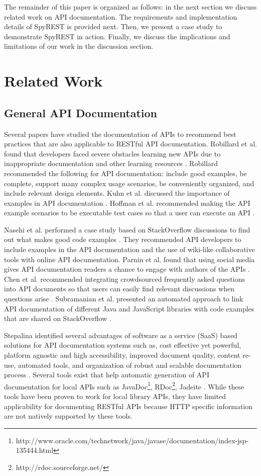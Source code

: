 The remainder of this paper is organized as follows: in the next section we discuss related work on API documentation. The requirements and implementation details of SpyREST is provided next. Then, we present a case study to demonstrate SpyREST in action. Finally, we discuss the implications and limitations of our work in the discussion section.


\section{Related Work} %
\label{sec:related_work}
\subsection{General API Documentation} %
\label{ssub:api_learnability}
Several papers have studied the documentation of APIs to recommend best practices that are also applicable to RESTful API documentation. Robillard et al. found that  developers faced severe obstacles learning new APIs due to inappropriate documentation and other learning resources \cite{Robillard_what_makes, Robillard_a_field_study}. Robillard recommended the following for API documentation: include good examples, be complete, support many complex usage scenarios, be conveniently organized, and include relevant design elements. Kuhn et al. discussed the importance of examples in API documentation \cite{Kuhn_on_designing}. Hoffman et al. recommended making the API example scenarios to be executable test cases so that a user can execute an API \cite{Hoffman_api_documentation}.

Nasehi et al. performed a case study based on StackOverflow discussions to find out what makes good code examples \cite{Nasehi_what_makes}. They recommended API developers to include examples in the API documentation and the use of wiki-like collaborative tools with online API documentation. Parnin et al. found that using social media gives API documentation readers a chance to engage with authors of the APIs \cite{Parnin_measuring}. Chen et al. recommended integrating crowdsourced frequently asked questions into API documents so that users can easily find relevant discussions when questions arise \cite{Chen_who_asked}. Subramanian et al. presented an automated approach to link API documentation of different Java and JavaScript libraries with code examples that are shared on StackOverflow \cite{Subramanian_live}.

Stepalina identified several advantages of software as a service (SaaS) based solutions for API documentation systems such as, cost effective yet powerful, platform agnostic and high accessibility, improved document quality, content re-use, automated tools, and organization of robust and scalable documentation process \cite{Stepalina_saas}. Several tools exist that help automatic generation of API documentation for local APIs such as JavaDoc\footnote{http://www.oracle.com/technetwork/java/javase/documentation/index-jsp-135444.html}, RDoc\footnote{http://rdoc.sourceforge.net/}, Jadeite \cite{Jadeite}. While these tools have been proven to work for local library APIs, they have limited applicability for documenting RESTful APIs because HTTP specific information are not natively supported by these tools.

